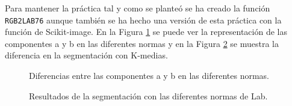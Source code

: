  Para mantener la práctica tal y como se planteó se ha creado la función \texttt{RGB2LAB76} aunque también se ha hecho una versión de esta práctica con la función de Scikit-image. En la Figura \ref{normaslab} se puede ver la representación de las componentes a y b en las diferentes normas y en la Figura \ref{comparativalab} se muestra la diferencia en la segmentación con K-medias.\\

\begin{figure}[!tbp]
  \centering
  \hfill
  \caption{Diferencias entre las componentes a y b en las diferentes normas.}
  \label{normaslab}
\end{figure}

\begin{figure}[!tbp]
  \centering
  \hfill
  \caption{Resultados de la segmentación con las diferentes normas de Lab.}
  \label{comparativalab}
\end{figure}

